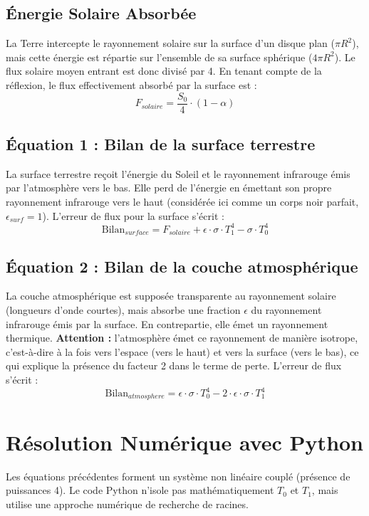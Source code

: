 \documentclass[11pt,a4paper]{article}
\begin{document}
\subsection{Énergie Solaire Absorbée}
La Terre intercepte le rayonnement solaire sur la surface d'un disque plan ($\pi R^2$), mais cette énergie est répartie sur l'ensemble de sa surface sphérique ($4 \pi R^2$). Le flux solaire moyen entrant est donc divisé par 4. En tenant compte de la réflexion, le flux effectivement absorbé par la surface est :
\begin{equation}
    F_{solaire} = \frac{S_0}{4} \cdot (1 - \alpha)
\end{equation}

\subsection{Équation 1 : Bilan de la surface terrestre}
La surface terrestre reçoit l'énergie du Soleil et le rayonnement infrarouge émis par l'atmosphère vers le bas. Elle perd de l'énergie en émettant son propre rayonnement infrarouge vers le haut (considérée ici comme un corps noir parfait, $\epsilon_{surf} = 1$). L'erreur de flux pour la surface s'écrit :
\begin{equation}
    \text{Bilan}_{surface} = F_{solaire} + \epsilon \cdot \sigma \cdot T_1^4 - \sigma \cdot T_0^4
\end{equation}

\subsection{Équation 2 : Bilan de la couche atmosphérique}
La couche atmosphérique est supposée transparente au rayonnement solaire (longueurs d'onde courtes), mais absorbe une fraction $\epsilon$ du rayonnement infrarouge émis par la surface. En contrepartie, elle émet un rayonnement thermique. \textbf{Attention :} l'atmosphère émet ce rayonnement de manière isotrope, c'est-à-dire à la fois vers l'espace (vers le haut) et vers la surface (vers le bas), ce qui explique la présence du facteur 2 dans le terme de perte. L'erreur de flux s'écrit :
\begin{equation}
    \text{Bilan}_{atmosphere} = \epsilon \cdot \sigma \cdot T_0^4 - 2 \cdot \epsilon \cdot \sigma \cdot T_1^4
\end{equation}

\section{Résolution Numérique avec Python}
Les équations précédentes forment un système non linéaire couplé (présence de puissances 4). Le code Python n'isole pas mathématiquement $T_0$ et $T_1$, mais utilise une approche numérique de recherche de racines.
\end{document}
